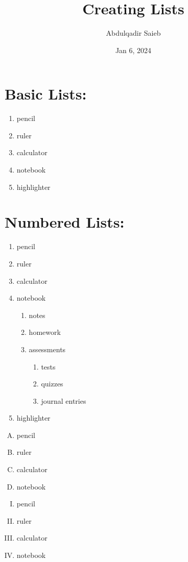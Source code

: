 \documentclass[11pt]{article}
\title{Creating Lists}
\author{Abdulqadir Saieb}
\date{Jan 6, 2024}
\begin{document}
\maketitle
\thispagestyle{empty}

\section{Basic Lists:}
\begin{enumerate}
\item[] pencil
\item[] ruler
\item[] calculator
\item[] notebook
\item[] highlighter
\end{enumerate}

\vspace{0.5cm}
\section{Numbered Lists:}
\begin{enumerate}
\item pencil
\item ruler
\item calculator
\item notebook
	\begin{enumerate}
	\item notes
	\item homework
	\item assessments
		\begin{enumerate}
		\item tests
		\item quizzes 
		\item journal entries
		\end{enumerate}
	\end{enumerate}
\item highlighter
\end{enumerate}

\vspace{0.5cm}
\begin{enumerate}[A.]
\item pencil
\item ruler
\item calculator
\item notebook
\end{enumerate}

\vspace{0.5cm}
\begin{enumerate}[I.]
\item pencil
\item ruler
\item calculator
\item notebook
\end{enumerate}
\end{document}

